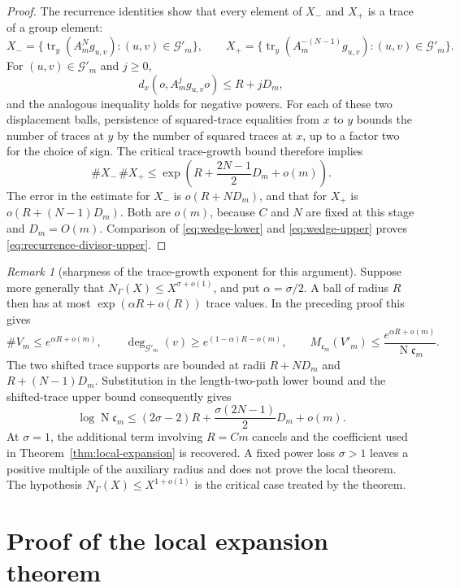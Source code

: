 \documentclass[11pt,reqno]{amsart}
\theoremstyle{definition}
\theoremstyle{remark}
\newtheorem{remark}[theorem]{Remark}
\newcommand{\cG}{\mathcal G}
\newcommand{\Tr}{\operatorname{tr}}
\newcommand{\Norm}{\operatorname{N}}
\begin{document}
\begin{proof}
The recurrence identities show that every element of \(X_-\) and \(X_+\)
is a trace of a group element:
\[
 X_- =\{\Tr_y(A_m^Ng_{u,v}):(u,v)\in\cG'_m\},\qquad
 X_+ =\{\Tr_y(A_m^{-(N-1)}g_{u,v}):(u,v)\in\cG'_m\}.
\]
For \((u,v)\in\cG'_m\) and \(j\ge0\),
\[
 d_x(o,A_m^jg_{u,v}o)\le R+jD_m,
\]
and the analogous inequality holds for negative powers.  For each of these
two displacement balls, persistence of squared-trace equalities from \(x\)
to \(y\) bounds the number of traces at \(y\) by the number of squared
traces at \(x\), up to a factor two for the choice of sign.  The critical
trace-growth bound therefore implies
\begin{equation}\label{eq:wedge-upper}
 \#X_-\,\#X_+
 \le\exp\left(R+\frac{2N-1}{2}D_m+o(m)\right).
\end{equation}
The error in the estimate for \(X_-\) is \(o(R+ND_m)\), and that for
\(X_+\) is \(o(R+(N-1)D_m)\).  Both are \(o(m)\), because \(C\) and \(N\)
are fixed at this stage and \(D_m=O(m)\).
Comparison of \eqref{eq:wedge-lower} and \eqref{eq:wedge-upper} proves
\eqref{eq:recurrence-divisor-upper}.
\end{proof}

\begin{remark}[sharpness of the trace-growth exponent for this argument]
\label{rem:critical-growth-sharpness}
Suppose more generally that
\(N_\Gamma(X)\le X^{\sigma+o(1)}\), and put \(\alpha=\sigma/2\).  A ball of
radius \(R\) then has at most \(\exp(\alpha R+o(R))\) trace values.  In the
preceding proof this gives
\[
 \#V_m\le e^{\alpha R+o(m)},\qquad
 \deg_{\cG'_m}(v)\ge e^{(1-\alpha)R-o(m)},\qquad
 M_{\mathfrak c_m}(V'_m)
 \le\frac{e^{\alpha R+o(m)}}{\Norm\mathfrak c_m}.
\]
The two shifted trace supports are bounded at radii \(R+ND_m\) and
\(R+(N-1)D_m\).  Substitution in the length-two-path lower bound and the
shifted-trace upper bound consequently gives
\[
 \log\Norm\mathfrak c_m
 \le (2\sigma-2)R
      +\frac{\sigma(2N-1)}2D_m+o(m).
\]
At \(\sigma=1\), the additional term involving \(R=Cm\) cancels and the
coefficient used in Theorem~\ref{thm:local-expansion} is recovered.  A fixed
power loss \(\sigma>1\) leaves a positive multiple of the auxiliary radius
and does not prove the local theorem.  The hypothesis
\(N_\Gamma(X)\le X^{1+o(1)}\) is the critical case treated by the theorem.
\end{remark}

\section{Proof of the local expansion theorem}
\label{sec:proof-local}
\end{document}
